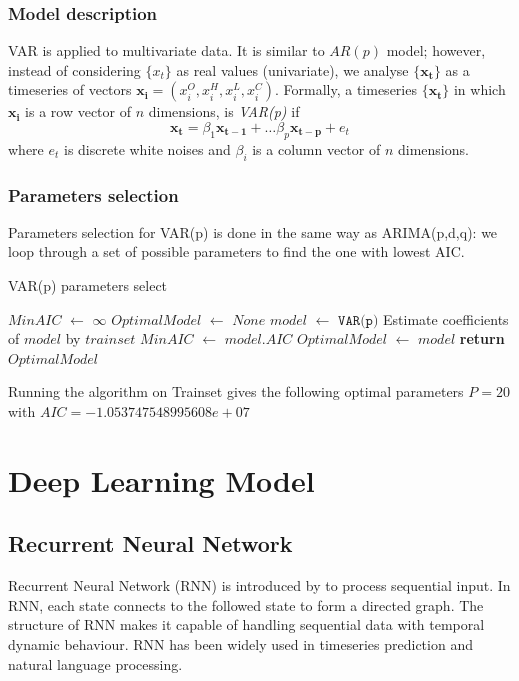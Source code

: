 \documentclass[11pt]{article}
\begin{document}
\subsubsection{Model description}
VAR is applied to multivariate data. It is similar to $AR(p)$ model; however,
instead of considering $\{x_t\}$ as real values (univariate), we analyse
$\{\mathbf{x_t}\}$ as a timeseries of vectors $\mathbf{x_i}=(x_i^O, x_i^H, x_i^L, x_i^C)$. 
Formally, a timeseries $\{\mathbf{x_t}\}$ in which $\mathbf{x_i}$ is a row
vector of $n$ dimensions,
is \textit{VAR(p)} if
$$
\mathbf{x_t}=\beta_1\mathbf{x_{t-1}} + \ldots \beta_p\mathbf{x_{t-p}} + e_t
$$
where $e_t$ is discrete white noises and $\beta_i$ is a column vector of $n$ dimensions.
\subsubsection{Parameters selection}
Parameters selection for VAR(p) is done in the same way as ARIMA(p,d,q): we loop
through a set of possible parameters to find the one with lowest AIC.
\begin{algorithm}[H]
\caption{VAR(p) parameters select}\label{paramsselect2}
\begin{algorithmic}[1]
  \State $MinAIC$ $\gets$ $\infty$
  \State $OptimalModel$ $\gets$ $None$
  \State $model$ $\gets$ $\texttt{VAR(p)}$
  \State Estimate coefficients of $model$ by $trainset$
  \State $MinAIC$ $\gets$ $model.AIC$
  \State $OptimalModel$ $\gets$ $model$
  \EndIf
  \EndFor
  \State \textbf{return} $OptimalModel$
\EndProcedure
\end{algorithmic}
\end{algorithm}
Running the algorithm on Trainset gives the following optimal parameters $P=20$
with $AIC=-1.053747548995608e+07$



\section{Deep Learning Model}
\subsection{Recurrent Neural Network}
Recurrent Neural Network (RNN) is introduced by \cite{rumelhart1988learning} to
process sequential input. In RNN, each state connects to the followed state to
form a directed graph. The structure of RNN makes it capable of handling
sequential data with temporal dynamic behaviour. RNN has been widely used in
timeseries prediction and natural language processing.
\end{document}
